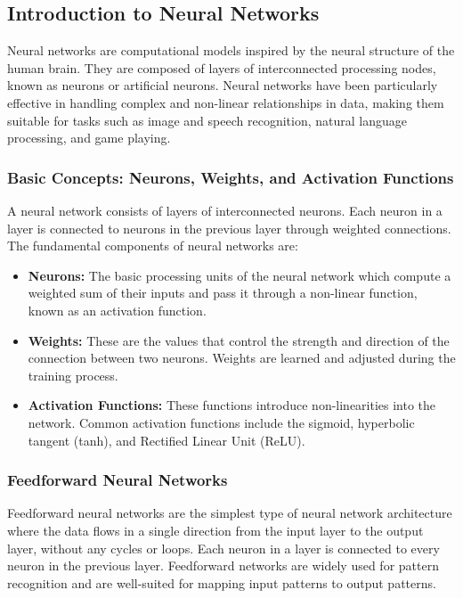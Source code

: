 \subsection{Introduction to Neural Networks}

Neural networks are computational models inspired by the neural structure of the human brain. They are composed of layers of interconnected processing nodes, known as neurons or artificial neurons. Neural networks have been particularly effective in handling complex and non-linear relationships in data, making them suitable for tasks such as image and speech recognition, natural language processing, and game playing.

\subsubsection{Basic Concepts: Neurons, Weights, and Activation Functions}

A neural network consists of layers of interconnected neurons. Each neuron in a layer is connected to neurons in the previous layer through weighted connections. The fundamental components of neural networks are:

\begin{itemize}
    \item \textbf{Neurons:} The basic processing units of the neural network which compute a weighted sum of their inputs and pass it through a non-linear function, known as an activation function.
    
    \item \textbf{Weights:} These are the values that control the strength and direction of the connection between two neurons. Weights are learned and adjusted during the training process.
    
    \item \textbf{Activation Functions:} These functions introduce non-linearities into the network. Common activation functions include the sigmoid, hyperbolic tangent (tanh), and Rectified Linear Unit (ReLU).
\end{itemize}

\subsubsection{Feedforward Neural Networks}

Feedforward neural networks are the simplest type of neural network architecture where the data flows in a single direction from the input layer to the output layer, without any cycles or loops. Each neuron in a layer is connected to every neuron in the previous layer. Feedforward networks are widely used for pattern recognition and are well-suited for mapping input patterns to output patterns.

